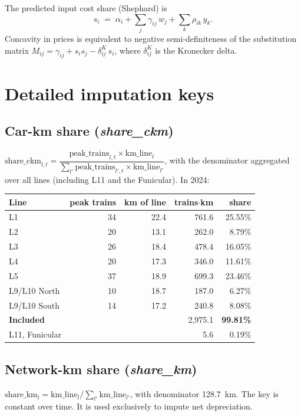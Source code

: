 \documentclass[11pt,a4paper]{article}
\begin{document}
The predicted input cost share (Shephard) is
\begin{equation}
s_i \;=\; \alpha_i + \sum_j \gamma_{ij}\, w_j + \sum_k \rho_{ik}\, y_k.
\end{equation}
Concavity in prices is equivalent to negative semi-definiteness of the
substitution matrix
$M_{ij} = \gamma_{ij} + s_i s_j - \delta_{ij}^K\, s_i$, where
$\delta_{ij}^K$ is the Kronecker delta.

\section{Detailed imputation keys}
\label{app:keys}

\subsection{Car-km share (\emph{share\_ckm})}
$\text{share\_ckm}_{l,t} = \dfrac{\text{peak\_trains}_{l,t}\times
\text{km\_line}_l}{\sum_{l'} \text{peak\_trains}_{l',t}\times
\text{km\_line}_{l'}}$,
with the denominator aggregated over all lines (including L11 and the
Funicular). In 2024:
\begin{center}
\footnotesize
\begin{tabular}{lrrrr}
\toprule
Line & peak trains & km of line & trains$\cdot$km & share \\
\midrule
L1   & 34 & 22.4 &   761.6 & 25.55\% \\
L2   & 20 & 13.1 &   262.0 & ~8.79\% \\
L3   & 26 & 18.4 &   478.4 & 16.05\% \\
L4   & 20 & 17.3 &   346.0 & 11.61\% \\
L5   & 37 & 18.9 &   699.3 & 23.46\% \\
L9/L10 North & 10 & 18.7 & 187.0 & ~6.27\% \\
L9/L10 South & 14 & 17.2 & 240.8 & ~8.08\% \\
\midrule
\textbf{Included} & & & 2{,}975.1 & \textbf{99.81\%} \\
L11, Funicular     & & &     5.6   &     0.19\% \\
\bottomrule
\end{tabular}
\end{center}

\subsection{Network-km share (\emph{share\_km})}
$\text{share\_km}_l = \text{km\_line}_l / \sum_{l'} \text{km\_line}_{l'}$,
with denominator 128.7~km. The key is constant over time. It is used
exclusively to impute net depreciation.
\end{document}
